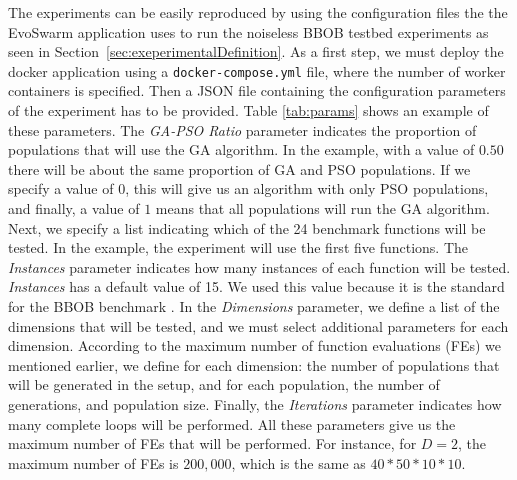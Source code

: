 \documentclass[review]{elsarticle}
\begin{document}
The experiments can be easily reproduced by using the configuration
files the the EvoSwarm application uses to run the noiseless BBOB testbed
experiments as seen in Section~\ref{sec:exeperimentalDefinition}. %
As a first step, we must deploy the docker application using a
{\tt docker-compose.yml} file, where the number of worker containers is
specified. Then a JSON file containing the configuration parameters of the
experiment has to be provided.  Table \ref{tab:params} shows an example of these
parameters. The {\em GA-PSO Ratio} parameter indicates the proportion of
populations that will use the GA algorithm.  In the example, with a value of
$0.50$ there will be about the same proportion of GA and PSO populations. If we
specify a value of $0$, this will give us an algorithm with only PSO
populations, and finally, a value of  $1$ means that all populations will run
the GA algorithm. %
Next, we specify a list indicating which of the 24 benchmark
functions will be tested. In the example, the experiment will use the first five
functions.  The {\em Instances} parameter indicates how many instances of each
function will be tested. {\em Instances}  has a default value of 15. We used this
value because it is the standard for the BBOB benchmark \cite{hansen2016coco}.
In the {\em Dimensions} parameter, we define a list of the dimensions that will
be tested, and we must select additional parameters for each dimension.
According to the maximum number of function evaluations (FEs) we mentioned
earlier, we define for each dimension: the number of populations that will be
generated in the setup, and for each population,  the number of generations, and
population size. Finally, the {\em Iterations} parameter indicates how many
complete loops will be performed. All these parameters give us the maximum
number of FEs that will be performed. For instance, for $D = 2$, the maximum
number of FEs is $200,000$, which is the same as $40*50*10*10$.
%
\end{document}
